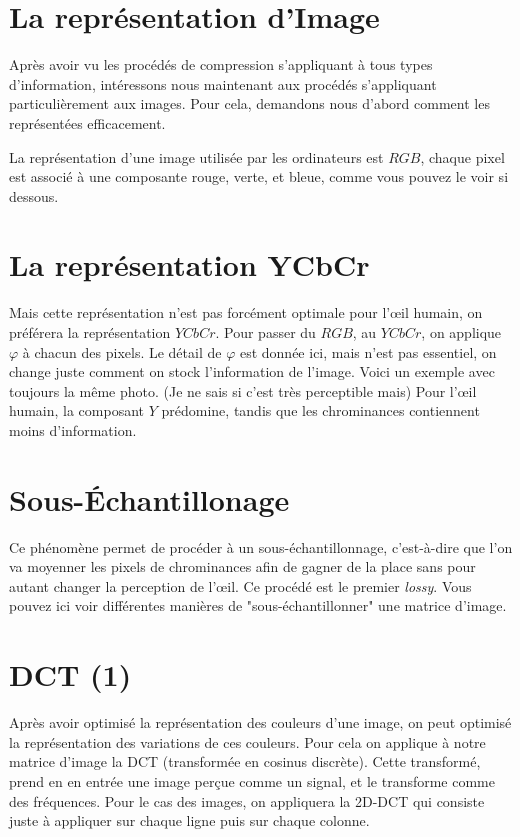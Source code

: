 \documentclass{article}
\begin{document}
\section{La représentation d'Image}

Après avoir vu les procédés de compression s'appliquant à tous types d'information, intéressons nous maintenant aux
procédés s'appliquant particulièrement aux images. Pour cela, demandons nous d'abord comment les représentées efficacement.

La représentation d'une image utilisée par les ordinateurs est $RGB$, chaque pixel est associé à une composante
rouge, verte, et bleue, comme vous pouvez le voir si dessous.

\section{La représentation YCbCr}

Mais cette représentation n'est pas forcément optimale pour l'\oe il humain, on préférera la représentation $YCbCr$.
Pour passer du $RGB$, au $YCbCr$, on applique $\varphi$ à chacun des pixels. Le détail de $\varphi$ est donnée ici, 
mais n'est pas essentiel, on change juste comment on stock l'information de l'image. Voici un exemple avec toujours
la même photo. (Je ne sais si c'est très perceptible mais) Pour l'\oe il humain, la composant $Y$ prédomine, tandis 
que les chrominances contiennent moins d'information.

\section{Sous-\'Echantillonage}

Ce phénomène permet de procéder à un sous-échantillonnage, c'est-à-dire que l'on va moyenner les pixels de chrominances
afin de gagner de la place sans pour autant changer la perception de l'\oe il. Ce procédé est le premier \textit{lossy}.
Vous pouvez ici voir différentes manières de "sous-échantillonner" une matrice d'image.

\section{DCT (1)}

Après avoir optimisé la représentation des couleurs d'une image, on peut optimisé la représentation des variations de ces
couleurs. Pour cela on applique à notre matrice d'image la DCT (transformée en cosinus discrète). Cette transformé, prend en
en entrée une image perçue comme un signal, et le transforme comme des fréquences. Pour le cas des images, on appliquera la 2D-DCT
qui consiste juste à appliquer sur chaque ligne puis sur chaque colonne.
\end{document}
